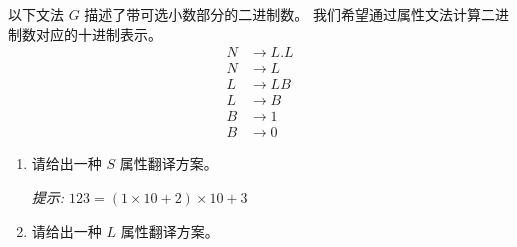 \documentclass[a4paper, justified]{tufte-handout}
\begin{document}
\begin{problem}[\score{10 = 5 + 5}]
  以下文法 $G$ 描述了带可选小数部分的二进制数。
  我们希望通过属性文法计算二进制数对应的十进制表示。
  \begin{align*}
    N &\to L . L \\
    N &\to L \\
    L &\to LB \\
    L &\to B \\
    B &\to 1 \\
    B &\to 0
  \end{align*}

  \begin{enumerate}[(1)]
    \item 请给出一种 $S$ 属性翻译方案。

      {\it 提示: $123 = (1 \times 10 + 2) \times 10 + 3$}
    \item 请给出一种 $L$ 属性翻译方案。
  \end{enumerate}
\end{problem}
\newpage
\end{document}
